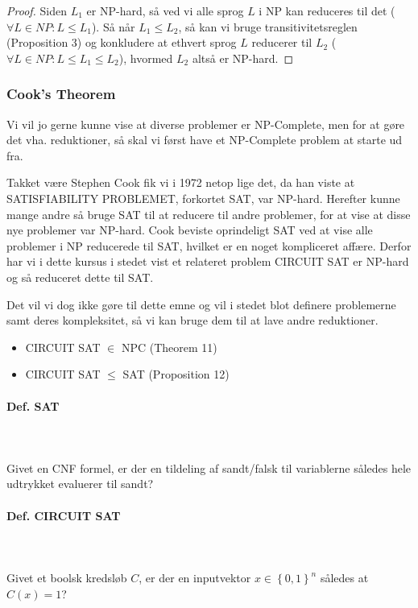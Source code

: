 \begin{proof}
 Siden $L_1$ er NP-hard, så ved vi alle sprog $L$ i NP kan reduceres til det
 ($\forall L \in NP: L \leq L_1$). Så når $L_1 \leq L_2$, så kan vi bruge
 transitivitetsreglen (Proposition 3) og konkludere at ethvert sprog $L$
 reducerer til $L_2$ ($\forall L \in NP: L \leq L_1 \leq L_2$), hvormed $L_2$
 altså er NP-hard.
\end{proof}


\subsubsection{Cook's Theorem}

Vi vil jo gerne kunne vise at diverse problemer er NP-Complete, men for at gøre
det vha. reduktioner, så skal vi først have et NP-Complete problem at starte ud
fra.

Takket være Stephen Cook fik vi i 1972 netop lige det, da han viste at
SATISFIABILITY PROBLEMET, forkortet SAT, var NP-hard. Herefter kunne mange
andre så bruge SAT til at reducere til andre problemer, for at vise at disse
nye problemer var NP-hard. Cook beviste oprindeligt SAT ved at vise alle
problemer i NP reducerede til SAT, hvilket er en noget kompliceret affære.
Derfor har vi i dette kursus i stedet vist et relateret problem CIRCUIT SAT er
NP-hard og så reduceret dette til SAT.

Det vil vi dog ikke gøre til dette emne og vil i stedet blot definere
problemerne samt deres kompleksitet, så vi kan bruge dem til at lave andre
reduktioner.

\begin{itemize}
 \item CIRCUIT SAT $\in$ NPC (Theorem 11)
 \item CIRCUIT SAT $\leq$ SAT (Proposition 12)
\end{itemize}

\paragraph{Def. SAT}
~\\
~\\
Givet en CNF formel, er der en tildeling af sandt/falsk til variablerne således
hele udtrykket evaluerer til sandt?\\

\paragraph{Def. CIRCUIT SAT}
~\\
~\\
Givet et boolsk kredsløb $C$, er der en inputvektor $x \in \left\lbrace 0,1
\right\rbrace^n$ således at $C(x) = 1$?

